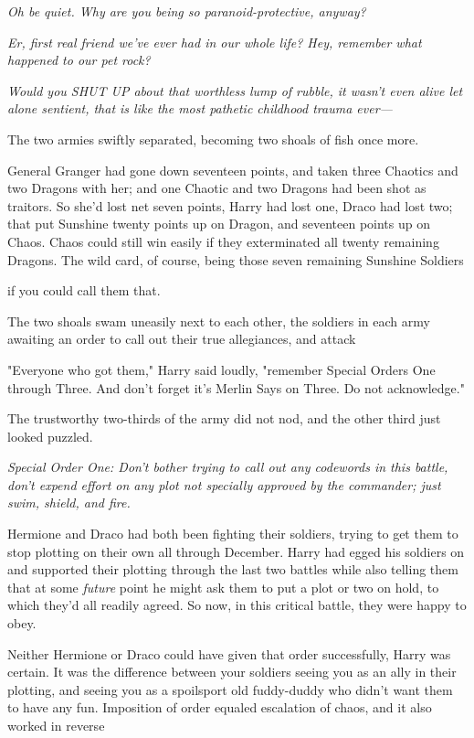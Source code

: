 \emph{Oh be quiet. Why are you being so paranoid-protective, anyway?}

\emph{Er, first real friend we've ever had in our whole life? Hey, remember
what happened to our pet rock?}

\emph{Would you SHUT UP about that worthless lump of rubble, it wasn't even
alive let alone sentient, that is like the most pathetic childhood trauma
ever---}

The two armies swiftly separated, becoming two shoals of fish once more.

General Granger had gone down seventeen points, and taken three Chaotics and
two Dragons with her; and one Chaotic and two Dragons had been shot as
traitors. So she'd lost net seven points, Harry had lost one, Draco had lost
two; that put Sunshine twenty points up on Dragon, and seventeen points up on
Chaos. Chaos could still win easily if they exterminated all twenty remaining
Dragons. The wild card, of course, being those seven remaining Sunshine
Soldiers{\el}

{\el} if you could call them that.

The two shoals swam uneasily next to each other, the soldiers in each army
awaiting an order to call out their true allegiances, and attack{\el}

"Everyone who got them," Harry said loudly, "remember Special Orders One
through Three. And don't forget it's Merlin Says on Three. Do not acknowledge."

The trustworthy two-thirds of the army did not nod, and the other third just
looked puzzled.

\emph{Special Order One: Don't bother trying to call out any codewords in this
battle, don't expend effort on any plot not specially approved by the
commander; just swim, shield, and fire.}

Hermione and Draco had both been fighting their soldiers, trying to get them to
stop plotting on their own all through December. Harry had egged his soldiers
on and supported their plotting through the last two battles{\el} while also
telling them that at some \emph{future} point he might ask them to put a plot
or two on hold, to which they'd all readily agreed. So now, in this critical
battle, they were happy to obey.

Neither Hermione or Draco could have given that order successfully, Harry was
certain. It was the difference between your soldiers seeing you as an ally in
their plotting, and seeing you as a spoilsport old fuddy-duddy who didn't want
them to have any fun. Imposition of order equaled escalation of chaos, and it
also worked in reverse{\el}

